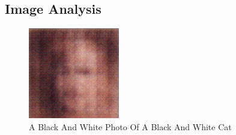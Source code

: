 \documentclass{article}%
\begin{document}
%
\subsection{Image Analysis}%
\label{subsec:ImageAnalysis}%


\begin{figure}[h!]%
\centering%
\includegraphics[width=150px]{500_fake_images/samples_5_116.png}%
\caption{A Black And White Photo Of A Black And White Cat}%
\end{figure}

%
\end{document}
